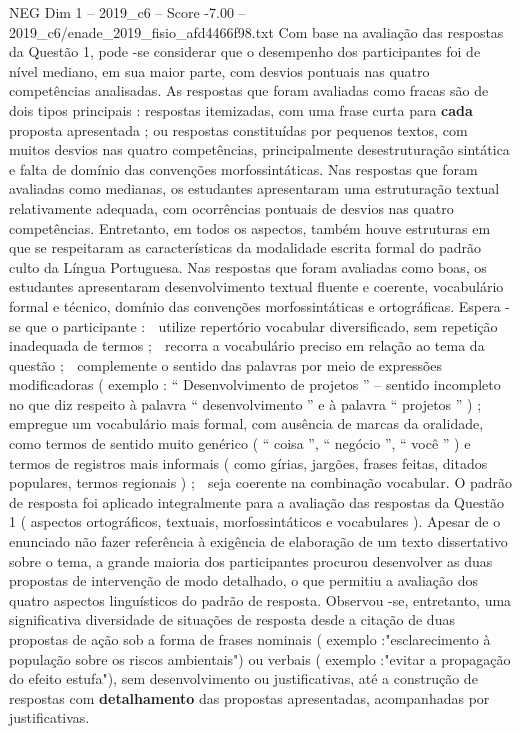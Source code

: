 \begin{textsample}{NEG Dim 1 – 2019\_c6 – Score -7.00 – 2019\_c6/enade\_2019\_fisio\_afd4466f98.txt}
Com base na avaliação das respostas da Questão 1, pode -se considerar que o desempenho dos participantes foi de nível mediano, em sua maior parte, com desvios pontuais nas quatro competências analisadas.
As respostas que foram avaliadas como fracas são de dois tipos principais : respostas itemizadas, com uma frase curta para \textbf{cada} proposta apresentada ; ou respostas constituídas por pequenos textos, com muitos desvios nas quatro competências, principalmente desestruturação sintática e falta de domínio das convenções morfossintáticas.
Nas respostas que foram avaliadas como medianas, os estudantes apresentaram uma estruturação textual relativamente adequada, com ocorrências pontuais de desvios nas quatro competências.
Entretanto, em todos os aspectos, também houve estruturas em que se respeitaram as características da modalidade escrita formal do padrão culto da Língua Portuguesa.
Nas respostas que foram avaliadas como boas, os estudantes apresentaram desenvolvimento textual fluente e coerente, vocabulário formal e técnico, domínio das convenções morfossintáticas e ortográficas.
Espera -se que o participante :  utilize repertório vocabular diversificado, sem repetição inadequada de termos ;  recorra a vocabulário preciso em relação ao tema da questão ;  complemente o sentido das palavras por meio de expressões modificadoras ( exemplo : “ Desenvolvimento de projetos ” – sentido incompleto no que diz respeito à palavra “ desenvolvimento ” e à palavra “ projetos ” ) ;  empregue um vocabulário mais formal, com ausência de marcas da oralidade, como termos de sentido muito genérico ( “ coisa ”, “ negócio ”, “ você ” ) e termos de registros mais informais ( como gírias, jargões, frases feitas, ditados populares, termos regionais ) ;  seja coerente na combinação vocabular.
O padrão de resposta foi aplicado integralmente para a avaliação das respostas da Questão 1 ( aspectos ortográficos, textuais, morfossintáticos e vocabulares ).
Apesar de o enunciado não fazer referência à exigência de elaboração de um texto dissertativo sobre o tema, a grande maioria dos participantes procurou desenvolver as duas propostas de intervenção de modo detalhado, o que permitiu a avaliação dos quatro aspectos linguísticos do padrão de resposta.
Observou -se, entretanto, uma significativa diversidade de situações de resposta desde a citação de duas propostas de ação sob a forma de frases nominais ( exemplo :"esclarecimento à população sobre os riscos ambientais") ou verbais ( exemplo :"evitar a propagação do efeito estufa"), sem desenvolvimento ou justificativas, até a construção de respostas com \textbf{detalhamento} das propostas apresentadas, acompanhadas por justificativas.

\end{textsample}
